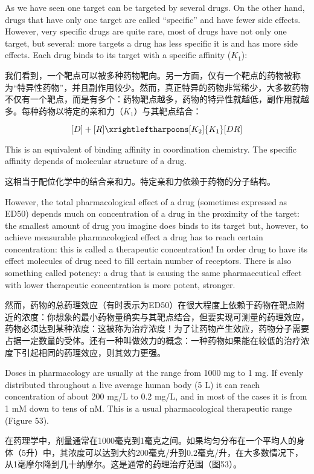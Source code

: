 \documentclass[dvipsnames, svgnames,a4paper,11pt]{article}
\begin{document}
As we have seen one target can be targeted by several drugs. On the other hand, drugs that have only one target are called “specific” and have fewer side effects. However, very specific drugs are quite rare, most of drugs have not only one target, but several: more targets a drug has less specific it is and has more side effects. Each drug binds to its target with a specific affinity ($K_1$):

我们看到，一个靶点可以被多种药物靶向。另一方面，仅有一个靶点的药物被称为“特异性药物”，并且副作用较少。然而，真正特异的药物非常稀少，大多数药物不仅有一个靶点，而是有多个：药物靶点越多，药物的特异性就越低，副作用就越多。每种药物以特定的亲和力（$K_1$）与其靶点结合：

$$ [D] + [R] \xrightleftharpoons[K_2]{K_1} [DR]$$


This is an equivalent of binding affinity in coordination chemistry. The specific affinity depends of molecular structure of a drug.

这相当于配位化学中的结合亲和力。特定亲和力依赖于药物的分子结构。

However, the total pharmacological effect of a drug (sometimes expressed as ED50) depends much on concentration of a drug in the proximity of the target: the smallest amount of drug you imagine does binds to its target but, however, to achieve measurable pharmacological effect a drug has to reach certain concentration: this is called a therapeutic concentration! In order drug to have its effect molecules of drug need to fill certain number of receptors. There is also something called potency: a drug that is causing the same pharmaceutical effect with lower therapeutic concentration is more potent, stronger.

然而，药物的总药理效应（有时表示为ED50）在很大程度上依赖于药物在靶点附近的浓度：你想象的最小药物量确实与其靶点结合，但要实现可测量的药理效应，药物必须达到某种浓度：这被称为治疗浓度！为了让药物产生效应，药物分子需要占据一定数量的受体。还有一种叫做效力的概念：一种药物如果能在较低的治疗浓度下引起相同的药理效应，则其效力更强。

Doses in pharmacology are usually at the range from 1000 mg to 1 mg. If evenly distributed throughout a live average human body (5 L) it can reach concentration of about 200 mg/L to 0.2 mg/L, and in most of the cases it is from 1 mM down to tens of nM. This is a usual pharmacological therapeutic range (Figure 53).

在药理学中，剂量通常在1000毫克到1毫克之间。如果均匀分布在一个平均人的身体（5升）中，其浓度可以达到大约200毫克/升到0.2毫克/升，在大多数情况下，从1毫摩尔降到几十纳摩尔。这是通常的药理治疗范围（图53）。
\end{document}
